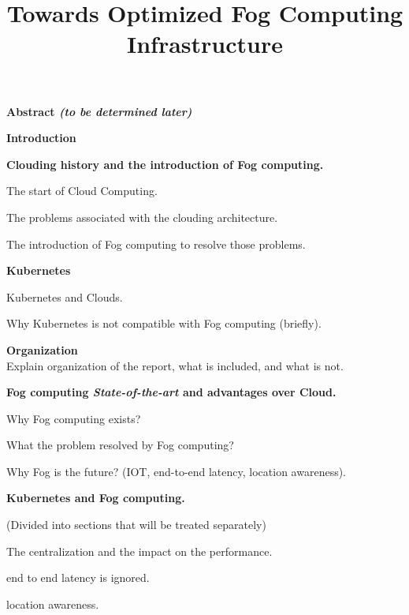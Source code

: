 \documentclass[9pt]{article}
\title {Towards Optimized Fog Computing Infrastructure}
\date{}
\begin{document}
\maketitle

	\begin{outline}
		\item {\bf Abstract {\em (to be determined later)}}
		\item {\bf Introduction }
  		\begin{outline}
			\item {\bf Clouding history and the introduction of Fog computing.} 
    		\begin{outline}
    			\item The start of Cloud Computing.
    			\item The problems associated with the clouding architecture. 
    			\item The introduction of Fog computing to resolve those problems. 
    		\end{outline}
    		\item {\bf Kubernetes}
    		\begin{outline}
				\item Kubernetes and Clouds.
				\item Why Kubernetes is not compatible with Fog computing (briefly).      	
    	
    		\end{outline}
    	\item {\bf Organization } \\
      		Explain organization of the report, what is included, and what is not.
     \end{outline}
    		
    		    	
	\item {\bf Fog computing {\em State-of-the-art} and advantages over Cloud. }
	\begin{outline}
	  	\item Why Fog computing exists? 
  		\item What the problem resolved by Fog computing?  
  		\item Why Fog is the future? (IOT, end-to-end latency, location awareness).
    \end{outline}
  
	\item {\bf Kubernetes and Fog computing. }
	\begin{outline}
	\small (Divided into sections that will be treated separately)
		\item The centralization and the impact on the performance.
		\item end to end latency is ignored. 
		\item location awareness.
				

\end{outline}
\end{outline}
\end{document}
